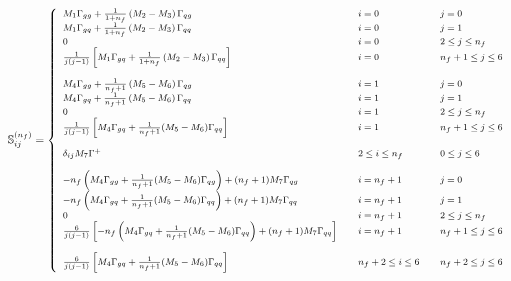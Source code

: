 \documentclass[10pt,a4paper]{article}
\begin{document}
\begin{equation}
\footnotesize
\mathbb{S}_{ij}^{(n_f)} =
\left\{
\begin{array}{lll}
M_1\Gamma_{gg}+\frac{1}{1+n_f}\left(M_2-M_3\right)\Gamma_{qg} &
                                                                      \quad i = 0 &\quad j = 0\\
M_1\Gamma_{gq}+\frac{1}{1+n_f}\left(M_2-M_3\right)\Gamma_{qq} & \quad i = 0 &\quad j =1\\
0 & \quad i = 0 &\quad  2\leq j \leq n_f\\
\frac1{j(j-1)}\left[M_1\Gamma_{gq}+\frac{1}{1+n_f}\left(M_2-M_3\right)\Gamma_{qq}\right] & \quad i = 0 &\quad  n_f+ 1\leq j \leq 6\\
\\
M_4\Gamma_{gg}+\frac{1}{n_f+1}\left(M_5-M_6\right)\Gamma_{qg} & \quad i = 1&\quad  j=0\\
M_4\Gamma_{gq}+\frac{1}{n_f+1}\left(M_5-M_6\right)\Gamma_{qq}& \quad i = 1 &\quad  j=1\\
0 & \quad i = 1 &\quad  2\leq j \leq n_f\\
\frac{1}{j(j-1)}\left[M_4\Gamma_{gq}+\frac{1}{n_f+1}(M_5-M_6)\Gamma_{qq}\right] & \quad i = 1 &\quad  n_f+1\leq j\leq 6\\
\\
\delta_{ij}M_7\Gamma^+&\quad 2\leq i \leq n_f &\quad 0\leq j
                                                         \leq 6\\
\\
-n_f\left(M_4\Gamma_{gg}+\frac{1}{n_f+1}(M_5-M_6)\Gamma_{qg}\right)+(n_f+1)M_7\Gamma_{qg}&\quad i = n_f+1 &\quad j =0\\
-n_f\left(M_4\Gamma_{gq}+\frac{1}{n_f+1}(M_5-M_6)\Gamma_{qq}\right)+(n_f+1)M_7\Gamma_{qq}&\quad i = n_f+1 &\quad j =1\\
0 & \quad i = n_f+1 &\quad  2\leq j \leq n_f\\
  \frac{6}{j(j-1)}\left[-n_f\left(M_4\Gamma_{gq}+\frac{1}{n_f+1}(M_5-M_6)\Gamma_{qq}\right)+(n_f+1)M_7\Gamma_{qq}\right]
&\quad i = n_f+1 &\quad n_f+1 \leq j \leq 6\\
\\
  \frac{6}{j(j-1)}\left[M_4\Gamma_{gq}+\frac{1}{n_f+1}(M_5-M_6)\Gamma_{qq} \right]
& \quad n_f+2\leq i \leq 6 &\quad  n_f+
                                                            2\leq j
                                                            \leq 6\\
\end{array}
\right.
\label{eq:Smatrix}
\end{equation}
\end{document}
